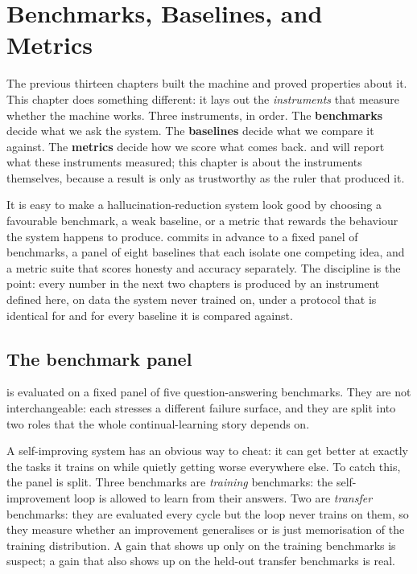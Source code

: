 \chapter{Benchmarks, Baselines, and Metrics}
\label{ch:benchmarks}

The previous thirteen chapters built the machine and proved properties about it.
This chapter does something different: it lays out the \emph{instruments} that
measure whether the machine works. Three instruments, in order. The
\textbf{benchmarks} decide what we ask the system. The \textbf{baselines} decide
what we compare it against. The \textbf{metrics} decide how we score what comes
back.  and  will report what these
instruments measured; this chapter is about the instruments themselves, because a
result is only as trustworthy as the ruler that produced it.

\begin{intuition}
It is easy to make a hallucination-reduction system look good by choosing a
favourable benchmark, a weak baseline, or a metric that rewards the behaviour the
system happens to produce. \caem{} commits in advance to a fixed panel of
benchmarks, a panel of eight baselines that each isolate one competing idea, and a
metric suite that scores honesty and accuracy separately. The discipline is the
point: every number in the next two chapters is produced by an instrument defined
here, on data the system never trained on, under a protocol that is identical for
\caem{} and for every baseline it is compared against.
\end{intuition}

\section{The benchmark panel}
\label{sec:bench-panel}

\caem{} is evaluated on a fixed panel of five question-answering benchmarks. They
are not interchangeable: each stresses a different failure surface, and they are
split into two roles that the whole continual-learning story depends on.

\begin{intuition}
A self-improving system has an obvious way to cheat: it can get better at exactly
the tasks it trains on while quietly getting worse everywhere else. To catch this,
the panel is split. Three benchmarks are \emph{training} benchmarks: the
self-improvement loop is allowed to learn from their answers. Two are
\emph{transfer} benchmarks: they are evaluated every cycle but the loop never
trains on them, so they measure whether an improvement generalises or is just
memorisation of the training distribution. A gain that shows up only on the
training benchmarks is suspect; a gain that also shows up on the held-out transfer
benchmarks is real.
\end{intuition}

